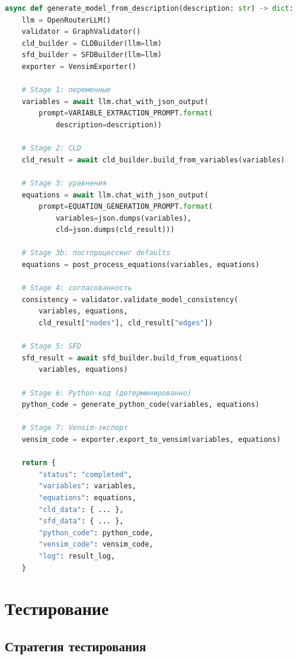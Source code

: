 \begin{lstlisting}[caption={Основная функция конвейера генерации}, language=Python, basicstyle=\ttfamily\scriptsize]
async def generate_model_from_description(description: str) -> dict:
    llm = OpenRouterLLM()
    validator = GraphValidator()
    cld_builder = CLDBuilder(llm=llm)
    sfd_builder = SFDBuilder(llm=llm)
    exporter = VensimExporter()

    # Stage 1: переменные
    variables = await llm.chat_with_json_output(
        prompt=VARIABLE_EXTRACTION_PROMPT.format(
            description=description))

    # Stage 2: CLD
    cld_result = await cld_builder.build_from_variables(variables)

    # Stage 3: уравнения
    equations = await llm.chat_with_json_output(
        prompt=EQUATION_GENERATION_PROMPT.format(
            variables=json.dumps(variables),
            cld=json.dumps(cld_result)))

    # Stage 3b: постпроцессинг defaults
    equations = post_process_equations(variables, equations)

    # Stage 4: согласованность
    consistency = validator.validate_model_consistency(
        variables, equations,
        cld_result["nodes"], cld_result["edges"])

    # Stage 5: SFD
    sfd_result = await sfd_builder.build_from_equations(
        variables, equations)

    # Stage 6: Python-код (детерминированно)
    python_code = generate_python_code(variables, equations)

    # Stage 7: Vensim-экспорт
    vensim_code = exporter.export_to_vensim(variables, equations)

    return {
        "status": "completed",
        "variables": variables,
        "equations": equations,
        "cld_data": { ... },
        "sfd_data": { ... },
        "python_code": python_code,
        "vensim_code": vensim_code,
        "log": result_log,
    }
\end{lstlisting}


\section{Тестирование}

\subsection{Стратегия тестирования}

